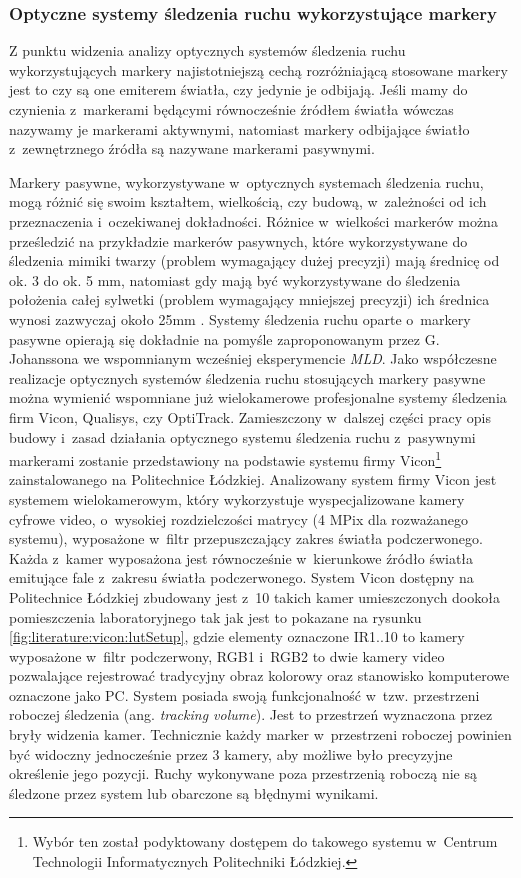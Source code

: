 \subsubsection*{Optyczne systemy śledzenia ruchu wykorzystujące markery}
Z punktu widzenia analizy optycznych systemów śledzenia ruchu wykorzystujących markery najistotniejszą cechą rozróżniającą stosowane markery jest to czy są one emiterem światła, czy jedynie je odbijają. Jeśli mamy do czynienia z~markerami będącymi równocześnie źródłem światła wówczas nazywamy je markerami aktywnymi, natomiast markery odbijające światło z~zewnętrznego źródła są nazywane markerami pasywnymi.

Markery pasywne, wykorzystywane w~optycznych systemach śledzenia ruchu, mogą różnić się swoim kształtem, wielkością, czy budową, w~zależności od ich przeznaczenia i~oczekiwanej dokładności. Różnice w~wielkości markerów można prześledzić na przykładzie markerów pasywnych, które wykorzystywane do śledzenia mimiki twarzy (problem wymagający dużej precyzji) mają średnicę od ok. 3 do ok. 5 mm, natomiast gdy mają być wykorzystywane do śledzenia położenia całej sylwetki (problem wymagający mniejszej precyzji) ich średnica wynosi zazwyczaj około 25mm \cite{ViconMarkersSet}. Systemy śledzenia ruchu oparte o~markery pasywne opierają się dokładnie na pomyśle zaproponowanym przez G. Johanssona we wspomnianym wcześniej eksperymencie \textsl{MLD}. Jako współczesne realizacje optycznych systemów śledzenia ruchu stosujących markery pasywne można wymienić wspomniane już wielokamerowe profesjonalne systemy śledzenia firm Vicon, Qualisys, czy OptiTrack. 
Zamieszczony w~dalszej części pracy opis budowy i~zasad działania optycznego systemu śledzenia ruchu z~pasywnymi markerami zostanie przedstawiony na podstawie systemu firmy Vicon\footnote{Wybór ten został podyktowany dostępem do takowego systemu w~Centrum Technologii Informatycznych Politechniki Łódzkiej.} zainstalowanego na Politechnice Łódzkiej. 
Analizowany system firmy Vicon jest systemem wielokamerowym, który wykorzystuje wyspecjalizowane kamery cyfrowe video, o~wysokiej rozdzielczości matrycy (4 MPix dla rozważanego systemu), wyposażone w~filtr przepuszczający zakres światła podczerwonego. Każda z~kamer wyposażona jest równocześnie w~kierunkowe źródło światła emitujące fale z~zakresu światła podczerwonego. System Vicon dostępny na Politechnice Łódzkiej zbudowany jest z~10 takich kamer umieszczonych dookoła pomieszczenia laboratoryjnego tak jak jest to pokazane na rysunku \ref{fig:literature:vicon:lutSetup}, gdzie elementy oznaczone IR1..10 to kamery wyposażone w~filtr podczerwony, RGB1 i~RGB2 to dwie kamery video pozwalające rejestrować tradycyjny obraz kolorowy oraz stanowisko komputerowe oznaczone jako PC. System posiada swoją funkcjonalność w~tzw. przestrzeni roboczej śledzenia (ang. \textsl{tracking volume}). Jest to przestrzeń wyznaczona przez bryły widzenia kamer. Technicznie każdy marker w~przestrzeni roboczej powinien być widoczny jednocześnie przez 3 kamery, aby możliwe było precyzyjne określenie jego pozycji. Ruchy wykonywane poza przestrzenią roboczą nie są śledzone przez system lub obarczone są błędnymi wynikami.

